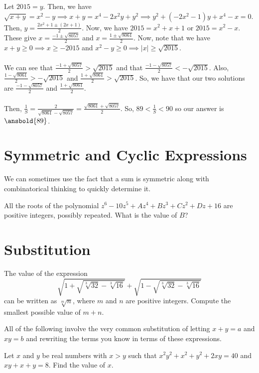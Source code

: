 \documentclass{article}
\begin{document}
\begin{sol}
Let $2015=y$. Then, we have $\sqrt{x+y}=x^2-y\implies x+y=x^4-2x^2y+y^2\implies y^2+(-2x^2-1)y+x^4-x=0$. Then, $y=\frac{2x^2+1 \pm (2x+1)}{2}$. Now, we have $2015=x^2+x+1$ or $2015=x^2-x$. These give $x=\frac{-1 \pm \sqrt{8057}}{2}$ and $x=\frac{1 \pm \sqrt{8061}}{2}$. Now, note that we have $x+y\ge 0 \implies x \ge -2015$ and $x^2-y\ge 0\implies |x|\ge \sqrt{2015}$. \\
\\
We can see that $\frac{-1 + \sqrt{8057}}{2}>\sqrt{2015}$ and that $\frac{-1-\sqrt{8057}}{2} < -\sqrt{2015}$. Also, $\frac{1-\sqrt{8061}}{2} > - \sqrt{2015}$ and $\frac{1+\sqrt{8061}}{2} > \sqrt{2015}$. So, we have that our two solutions are $\frac{-1-\sqrt{8057}}{2}$ and $\frac{1+\sqrt{8061}}{2}$. \\
\\
Then, $\frac{1}{S}=\frac{2}{\sqrt{8061}-\sqrt{8057}}=\frac{\sqrt{8061}+\sqrt{8057}}{2}$. So, $89 < \frac{1}{S} < 90$ so our answer is $\ansbold{89}$.
\end{sol}

\section{Symmetric and Cyclic Expressions}
We can sometimes use the fact that a sum is symmetric along with combinatorical thinking to quickly determine it.

\begin{exam}[AMC 10A 2021/14]
All the roots of the polynomial $z^6-10z^5+Az^4+Bz^3+Cz^2+Dz+16$ are positive integers, possibly repeated. What is the value of $B$?
\end{exam}

\section{Substitution}

\begin{exam}[NEMO 2017]
The value of the expression
$$\sqrt{1+\sqrt{\sqrt[3]{32}-\sqrt[3]{16}}} + \sqrt{1-\sqrt{\sqrt[3]{32}-\sqrt[3]{16}}}$$
can be written as $\sqrt[m]{n}$, where $m$ and $n$ are positive integers. Compute the smallest possible value of
$m + n$.
\end{exam}

All of the following involve the very common substitution of letting $x+y=a$ and $xy=b$ and rewriting the terms you know in terms of these expressions.
\begin{exam}
Let $x$ and $y$ be real numbers with $x > y$ such that $x^2 y^2 + x^2 + y^2 + 2xy = 40$ and $xy + x + y = 8$. Find
the value of $x$.
\end{exam}
\end{document}
